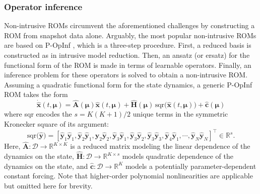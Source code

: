 \documentclass[3p,computermodern,11pt]{elsarticle}
\numberwithin{equation}{section}
\newcommand{\reducedOperatorLinear}{\hat{\mathbf{A}}}
\newcommand{\reducedOperatorQuadratic}{\hat{\mathbf{H}}}
\newcommand{\reducedState}{\hat{\state}}
\newcommand{\reducedOperatorConstant}{\hat{\mathbf{c}}}
\newcommand{\sqr}[1]{\mathrm{sqr}\big(#1 \big)}
\newcommand{\state}{\boldsymbol x}
\newcommand{\stateDummy}{\boldsymbol y}
\newcommand{\params}{\boldsymbol \mu}
\newcommand{\paramDomain}{\mathcal{D}}
\newcommand{\RR}[1]{\mathbb{R}^{#1}}
\newcommand{\romDim}{K}
\newcommand{\reducedStateDummy}{\hat{\stateDummy}}
\begin{document}
\subsubsection{Operator inference}
Non-intrusive ROMs circumvent the aforementioned challenges by constructing a ROM from snapshot data alone. Arguably, the most popular non-intrusive ROMs are based on P-OpInf \cite{PeWi16}, which is a three-step procedure.  First, a reduced basis is constructed as in intrusive model reduction.  Then,  an ansatz (or ersatz) for the functional form of the ROM is made in terms of learnable operators.  Finally, an inference problem for these operators is solved to obtain a non-intrusive ROM. Assuming a quadratic functional form for the state dynamics, a generic P-OpInf ROM takes the form
\begin{equation}\label{eq:opinf_quadratic}
\dot \reducedState(t,\params)= \reducedOperatorLinear(\params) \reducedState(t,\params) + \reducedOperatorQuadratic(\params)\, \sqr{\reducedState(t,\params)} + \reducedOperatorConstant(\params) 
\end{equation}
where sqr encodes the $s = K(K+1)/2$ unique terms in the symmetric Kronecker square of its argument:
$$\sqr{\reducedStateDummy} = \left[ \reducedStateDummy_1 \reducedStateDummy_1, \reducedStateDummy_2 \reducedStateDummy_1, \reducedStateDummy_2 \reducedStateDummy_2, \reducedStateDummy_3 \reducedStateDummy_1, \reducedStateDummy_3 \reducedStateDummy_2 ,\reducedStateDummy_3 \reducedStateDummy_3,\reducedStateDummy_4 \reducedStateDummy_1,\cdots, \reducedStateDummy_N \reducedStateDummy_N \right]^\intercal \in \RR{s}.$$
Here, $\reducedOperatorLinear : \paramDomain \rightarrow \RR{\romDim \times \romDim}$ is a reduced matrix modeling the linear dependence of the dynamics on the state, $\reducedOperatorQuadratic : \paramDomain \rightarrow \RR{\romDim \times s}$ models quadratic dependence of the dynamics on the state, and $\reducedOperatorConstant: \paramDomain \rightarrow \RR{\romDim}$ models a potentially parameter-dependent constant forcing. Note that higher-order polynomial nonlinearities are applicable but omitted here for brevity.
\end{document}
